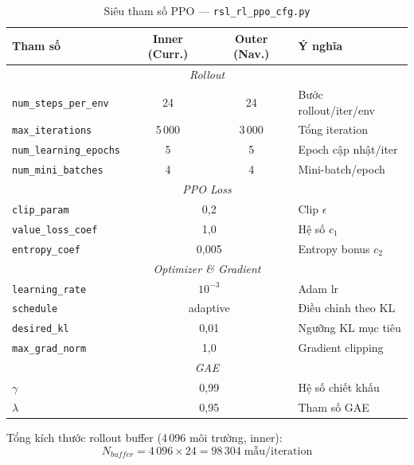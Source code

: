 \begin{table}[H]
    \centering
    \caption{Siêu tham số PPO — \texttt{rsl\_rl\_ppo\_cfg.py}}
    \label{tab:ppo_cfg}
    \renewcommand{\arraystretch}{1.3}
    \begin{tabular}{|l|c|c|l|}
    \hline
    \textbf{Tham số} & \textbf{Inner (Curr.)} & \textbf{Outer (Nav.)} & \textbf{Ý nghĩa} \\
    \hline
    \multicolumn{4}{|c|}{\textit{Rollout}} \\
    \hline
    \texttt{num\_steps\_per\_env}  & 24     & 24     & Bước rollout/iter/env \\
    \texttt{max\_iterations}       & 5\,000 & 3\,000 & Tổng iteration \\
    \texttt{num\_learning\_epochs} & 5      & 5      & Epoch cập nhật/iter \\
    \texttt{num\_mini\_batches}    & 4      & 4      & Mini-batch/epoch \\
    \hline
    \multicolumn{4}{|c|}{\textit{PPO Loss}} \\
    \hline
    \texttt{clip\_param}           & \multicolumn{2}{c|}{0{,}2}   & Clip $\epsilon$ \\
    \texttt{value\_loss\_coef}     & \multicolumn{2}{c|}{1{,}0}   & Hệ số $c_1$ \\
    \texttt{entropy\_coef}         & \multicolumn{2}{c|}{0{,}005} & Entropy bonus $c_2$ \\
    \hline
    \multicolumn{4}{|c|}{\textit{Optimizer \& Gradient}} \\
    \hline
    \texttt{learning\_rate}  & \multicolumn{2}{c|}{$10^{-3}$} & Adam lr \\
    \texttt{schedule}        & \multicolumn{2}{c|}{adaptive}  & Điều chỉnh theo KL \\
    \texttt{desired\_kl}     & \multicolumn{2}{c|}{0{,}01}    & Ngưỡng KL mục tiêu \\
    \texttt{max\_grad\_norm} & \multicolumn{2}{c|}{1{,}0}     & Gradient clipping \\
    \hline
    \multicolumn{4}{|c|}{\textit{GAE}} \\
    \hline
    $\gamma$ & \multicolumn{2}{c|}{0{,}99} & Hệ số chiết khấu \\
    $\lambda$ & \multicolumn{2}{c|}{0{,}95} & Tham số GAE \\
    \hline
    \end{tabular}
\end{table}

Tổng kích thước rollout buffer (4\,096 môi trường, inner):
\begin{equation}
    N_{buffer} = 4\,096 \times 24 = 98\,304\;\text{mẫu/iteration}
    \label{eq:buffer_size}
\end{equation}

